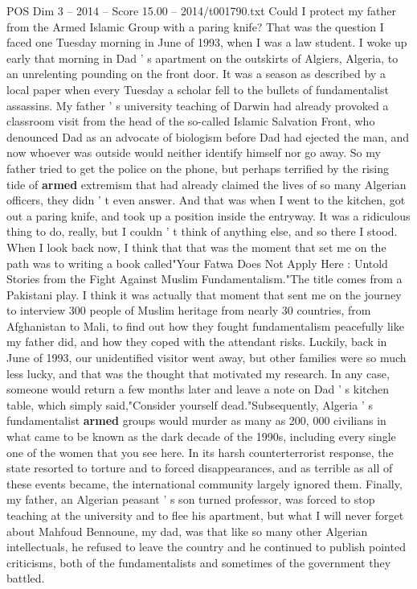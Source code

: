\begin{textsample}{POS Dim 3 – 2014 – Score 15.00 – 2014/t001790.txt}  \label{ex:f3_pos_036}
Could I protect my father from the Armed Islamic Group with a paring knife?
That was the question I faced one Tuesday morning in June of 1993, when I was a law student.
I woke up early that morning in Dad ' s apartment on the outskirts of Algiers, Algeria, to an unrelenting pounding on the front door.
It was a season as described by a local paper when every Tuesday a scholar fell to the bullets of fundamentalist assassins.
My father ' s university teaching of Darwin had already provoked a classroom visit from the head of the so-called Islamic Salvation Front, who denounced Dad as an advocate of biologism before Dad had ejected the man, and now whoever was outside would neither identify himself nor go away.
So my father tried to get the police on the phone, but perhaps terrified by the rising tide of \textbf{armed} extremism that had already claimed the lives of so many Algerian officers, they didn ' t even answer.
And that was when I went to the kitchen, got out a paring knife, and took up a position inside the entryway.
It was a ridiculous thing to do, really, but I couldn ' t think of anything else, and so there I stood.
When I look back now, I think that that was the moment that set me on the path was to writing a book called"Your Fatwa Does Not Apply Here : Untold Stories from the Fight Against Muslim Fundamentalism."The title comes from a Pakistani play.
I think it was actually that moment that sent me on the journey to interview 300 people of Muslim heritage from nearly 30 countries, from Afghanistan to Mali, to find out how they fought fundamentalism peacefully like my father did, and how they coped with the attendant risks.
Luckily, back in June of 1993, our unidentified visitor went away, but other families were so much less lucky, and that was the thought that motivated my research.
In any case, someone would return a few months later and leave a note on Dad ' s kitchen table, which simply said,"Consider yourself dead."Subsequently, Algeria ' s fundamentalist \textbf{armed} groups would murder as many as 200, 000 civilians in what came to be known as the dark decade of the 1990s, including every single one of the women that you see here.
In its harsh counterterrorist response, the state resorted to torture and to forced disappearances, and as terrible as all of these events became, the international community largely ignored them.
Finally, my father, an Algerian peasant ' s son turned professor, was forced to stop teaching at the university and to flee his apartment, but what I will never forget about Mahfoud Bennoune, my dad, was that like so many other Algerian intellectuals, he refused to leave the country and he continued to publish pointed criticisms, both of the fundamentalists and sometimes of the government they battled.

\end{textsample}
